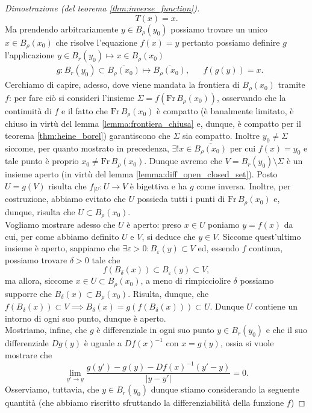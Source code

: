 \begin{proof}[Dimostrazione (del teorema \ref{thm:inverse_function})]
	$$
		T(x) = x.
	$$
	Ma prendendo arbitrariamente $y \in B_\rho(y_0)$ possiamo trovare un unico $x \in B_\rho(x_0)$ che risolve l'equazione $f(x) = y$
	pertanto possiamo definire $g$ l'applicazione $y \in B_{r}(y_0) \mapsto x \in B_{\rho}(x_0)$
	\begin{align*}
		&g: B_{r}(y_0) \subset \overline{B_{\rho} (x_0)} \mapsto \overline{B_\rho(x_0)}, & &f(g(y)) = x.
    \end{align*}
	Cerchiamo di capire, adesso, dove viene mandata la frontiera di $B_\rho(x_0)$ tramite $f$: per fare ciò si consideri l'insieme $\Sigma = f(\text{Fr} \, B_\rho(x_0))$, osservando che la continuità di $f$ e il fatto che $\text{Fr} \, B_\rho(x_0)$ è compatto (è banalmente limitato, è chiuso in virtù del lemma \ref{lemma:frontiera_chiusa} e, dunque, è compatto per il teorema \ref{thm:heine_borel}) garantiscono che $\Sigma$ sia compatto. Inoltre
    $y_0 \neq \Sigma$ siccome, per quanto mostrato in precedenza, $\exists ! x \in \overline{B_\rho(x_0)}$ per cui $f(x) = y_0$ e tale punto è proprio $x_0 \neq \text{Fr} \, B_\rho(x_0)$. Dunque avremo che $V = B_r(y_0) \setminus \Sigma$ è un insieme aperto (in virtù del lemma \ref{lemma:diff_open_closed_set}). Posto $U = g(V)$ risulta che $f_{|U} : U \to V$ è bigettiva
    e ha $g$ come inversa. Inoltre, per costruzione, abbiamo evitato che $U$ possieda tutti i punti di $\text{Fr} \, B_\rho(x_0)$ e, dunque, risulta che $U \subset B_\rho(x_0)$. \\
    Vogliamo mostrare adesso che $U$ è aperto: preso $x \in U$ poniamo $y = f(x)$ da cui, per come abbiamo definito $U$ e $V$, si deduce che $y \in V$. Siccome quest'ultimo insieme è aperto, sappiamo che $\exists \varepsilon > 0: B_\varepsilon(y) \subset V$ ed, essendo $f$ continua, possiamo trovare $\delta > 0$ tale che
    $$
    f(B_\delta(x)) \subset B_\varepsilon(y) \subset V,
    $$
    ma allora, siccome $x \in U \subset B_\rho(x_0)$, a meno di rimpicciolire $\delta$ possiamo supporre che $B_\delta(x) \subset B_\rho(x_0)$. Risulta, dunque, che $f(B_\delta(x)) \subset V \implies B_\delta(x) = g(f(B_\delta(x))) \subset U$. Dunque $U$ contiene un intorno di ogni suo punto, dunque è aperto. \\
    Mostriamo, infine, che $g$ è differenziale in ogni suo punto $y \in B_r(y_0)$ e che il suo differenziale $Dg(y)$ è uguale a $Df(x)^{-1}$ con $x = g(y)$, ossia si vuole mostrare che
    $$
        \lim_{y' \to y} \frac{g(y') - g(y) - Df(x)^{-1}(y'-y)}{|y-y'|} = 0.
    $$
    Osserviamo, tuttavia, che $y \in B_r(y_0)$ dunque stiamo considerando la seguente quantità (che abbiamo riscritto sfruttando la differenziabilità della funzione $f$)

\end{proof}
